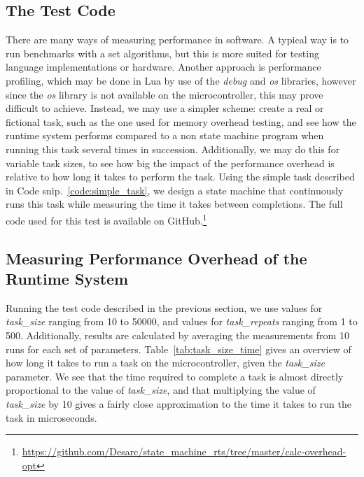 \subsection{The Test Code}
\label{sec:performance_test_code}
There are many ways of measuring performance in software. A typical way is to run benchmarks with a set algorithms, but this is more suited for testing language implementations or hardware. Another approach is performance profiling, which may be done in Lua by use of the \emph{debug} and \emph{os} libraries, however since the \emph{os} library is not available on the microcontroller, this may prove difficult to achieve. Instead, we may use a simpler scheme: create a real or fictional task, such as the one used for memory overhead testing, and see how the runtime system performs compared to a non state machine program when running this task several times in succession. Additionally, we may do this for variable task sizes, to see how big the impact of the performance overhead is relative to how long it takes to perform the task. Using the simple task described in Code snip.~\ref{code:simple_task}, we design a state machine that continuously runs this task while measuring the time it takes between completions. The full code used for this test is available on GitHub.\footnote{\url{https://github.com/Desarc/state_machine_rts/tree/master/calc-overhead-opt}}

\subsection{Measuring Performance Overhead of the Runtime System}
\label{sec:performance_overhead_measure}
Running the test code described in the previous section, we use values for \emph{task\_size} ranging from 10 to 50000, and values for \emph{task\_repeats} ranging from 1 to 500. Additionally, results are calculated by averaging the measurements from 10 runs for each set of parameters. Table~\ref{tab:task_size_time} gives an overview of how long it takes to run a task on the microcontroller, given the \emph{task\_size} parameter. We see that the time required to complete a task is almost directly proportional to the value of \emph{task\_size}, and that multiplying the value of \emph{task\_size} by 10 gives a fairly close approximation to the time it takes to run the task in microseconds.

